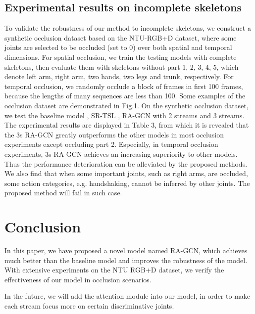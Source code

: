 \documentclass{article}
\begin{document}
\subsection{Experimental results on incomplete skeletons}
\label{ssec:occlusion}

To validate the robustness of our method to incomplete skeletons, we construct a synthetic occlusion dataset based on the NTU-RGB+D dataset, where some joints are selected to be occluded (set to 0) over both spatial and temporal dimensions. For spatial occlusion, we train the testing models with complete skeletons, then evaluate them with skeletons without part 1, 2, 3, 4, 5, which denote left arm, right arm, two hands, two legs and trunk, respectively. For temporal occlusion, we randomly occlude a block of frames in first 100 frames, because the lengths of many sequences are less than 100. Some examples of the occlusion dataset are demonstrated in Fig.1. On the synthetic occlusion dataset, we test the baseline model \cite{Yan2018}, SR-TSL \cite{Si2018}, RA-GCN with 2 streams and 3 streams. The experimental results are displayed in Table 3, from which it is revealed that the 3s RA-GCN greatly outperforms the other models in most occlusion experiments except occluding part 2. Especially, in temporal occlusion experiments, 3s RA-GCN achieves an increasing superiority to other models. Thus the performance deterioration can be alleviated by the proposed methods. We also find that when some important joints, such as right arms, are occluded, some action categories, e.g. handshaking, cannot be inferred by other joints. The proposed method will fail in such case.


\section{Conclusion}
\label{sec:conclusion}

In this paper, we have proposed a novel model named RA-GCN, which achieves much better than the baseline model and improves the robustness of the model. With extensive experiments on the NTU RGB+D dataset, we verify the effectiveness of our model in occlusion scenarios.

In the future, we will add the attention module into our model, in order to make each stream focus more on certain discriminative joints.




\end{document}
